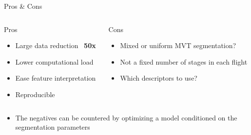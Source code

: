 \documentclass{beamer}
\begin{document}
        \begin{frame}{Pros \& Cons}
            \begin{columns}
                \begin{column}{0.45\textwidth}
                    \begin{exampleblock}{Pros}
                        \begin{itemize}
                            \item Large data reduction ~\textbf{50x}
                            \item Lower computational load
                            \item Ease feature interpretation
                            \item Reproducible
                        \end{itemize}
                    \end{exampleblock}
                \end{column}
                \begin{column}{0.45\textwidth}
                    \begin{alertblock}{Cons}
                        \begin{itemize}
                            \item Mixed or uniform MVT segmentation?
                            \item Not a fixed number of stages in each flight
                            \item Which descriptors to use?
                        \end{itemize}
                    \end{alertblock}
                \end{column}
            \end{columns}
            \begin{itemize}
                \item The negatives can be countered by optimizing a model conditioned on the segmentation parameters
            \end{itemize}
        \end{frame}
\end{document}
